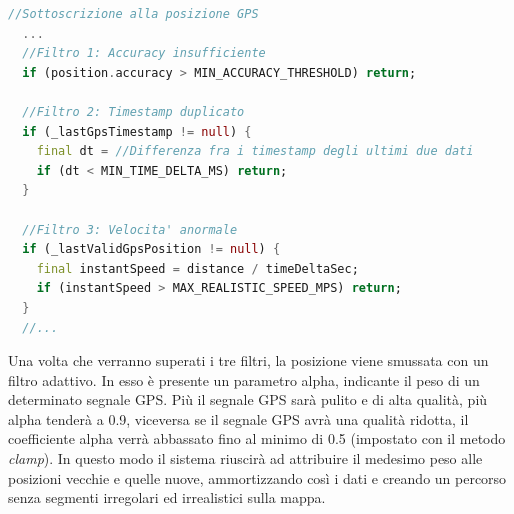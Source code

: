 \documentclass[target=bach,aauheader=,style=]{thud}
\begin{document}
\begin{lstlisting}[language=dart, caption={Composizione di tre filtri per la validazione dei dati GPS.}, label={sm_gps_filters}]
  //Sottoscrizione alla posizione GPS
  ...
  //Filtro 1: Accuracy insufficiente
  if (position.accuracy > MIN_ACCURACY_THRESHOLD) return;

  //Filtro 2: Timestamp duplicato
  if (_lastGpsTimestamp != null) {
    final dt = //Differenza fra i timestamp degli ultimi due dati
    if (dt < MIN_TIME_DELTA_MS) return;
  }
  
  //Filtro 3: Velocita' anormale
  if (_lastValidGpsPosition != null) {
    final instantSpeed = distance / timeDeltaSec;
    if (instantSpeed > MAX_REALISTIC_SPEED_MPS) return;
  }
  //...
\end{lstlisting}
Una volta che verranno superati i tre filtri, la posizione viene smussata con un filtro adattivo. In esso è presente un parametro alpha, indicante il peso di un determinato segnale GPS. Più il segnale GPS sarà pulito e di alta qualità, più alpha tenderà a 0.9, viceversa se il segnale GPS avrà una qualità ridotta, il coefficiente alpha verrà abbassato fino al minimo di 0.5 (impostato con il metodo \textit{clamp}). In questo modo il sistema riuscirà ad attribuire il medesimo peso alle posizioni vecchie e quelle nuove, ammortizzando così i dati e creando un percorso senza segmenti irregolari ed irrealistici sulla mappa.
\end{document}
